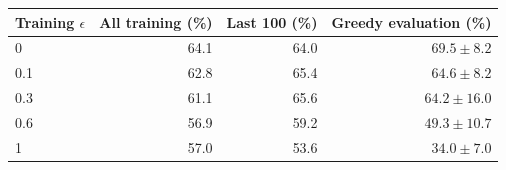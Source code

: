 \begin{tabular}{lrrr}
\toprule
Training $\epsilon$ & All training (\%) & Last 100 (\%) & Greedy evaluation (\%) \\
\midrule
0 & 64.1 & 64.0 & $69.5 \pm 8.2$ \\
0.1 & 62.8 & 65.4 & $64.6 \pm 8.2$ \\
0.3 & 61.1 & 65.6 & $64.2 \pm 16.0$ \\
0.6 & 56.9 & 59.2 & $49.3 \pm 10.7$ \\
1 & 57.0 & 53.6 & $34.0 \pm 7.0$ \\
\bottomrule
\end{tabular}
